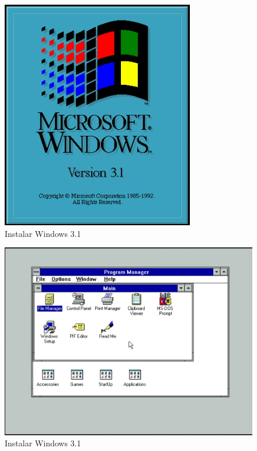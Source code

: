 \documentclass{report}
\begin{document}
\begin{figure}
\centering
\includegraphics[width=\textwidth]{Screenshot_38.png}
\caption{Instalar Windows 3.1}
\label{fig:38}
\end{figure}

\begin{figure}
\centering
\includegraphics[width=\textwidth]{Screenshot_39.png}
\caption{Instalar Windows 3.1}
\label{fig:39}
\end{figure}
\end{document}
